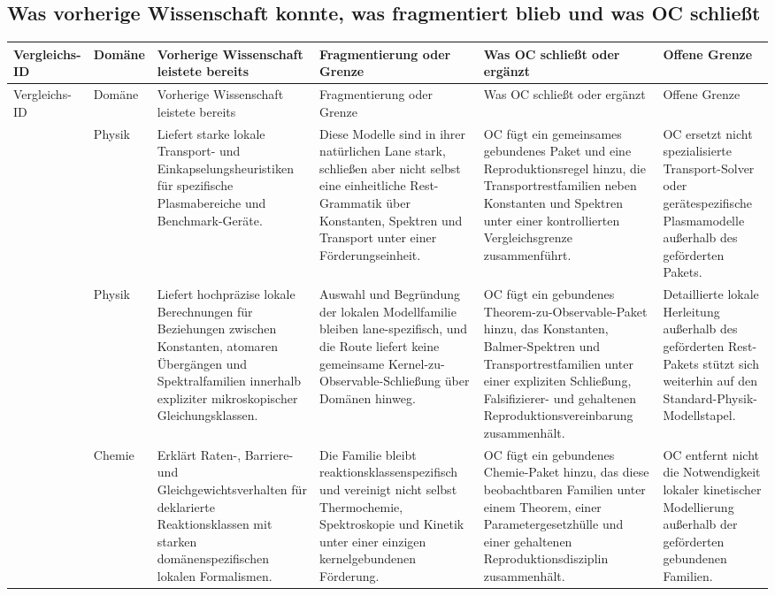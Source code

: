 \subsection{Was vorherige Wissenschaft konnte, was fragmentiert blieb und was OC schließt}
\begingroup
\scriptsize
\setlength{\emergencystretch}{1.5em}
\setlength{\tabcolsep}{2pt}
\setlength{\LTleft}{0pt}
\setlength{\LTright}{0pt}
\begin{longtable}{@{}L{0.17\textwidth}L{0.09\textwidth}L{0.17\textwidth}L{0.17\textwidth}L{0.20\textwidth}L{0.14\textwidth}@{}}
\toprule
Vergleichs-ID & Domäne & Vorherige Wissenschaft leistete bereits & Fragmentierung oder Grenze & Was OC schließt oder ergänzt & Offene Grenze \\
\midrule
\endfirsthead
\toprule
Vergleichs-ID & Domäne & Vorherige Wissenschaft leistete bereits & Fragmentierung oder Grenze & Was OC schließt oder ergänzt & Offene Grenze \\
\midrule
\endhead
{} & Physik & Liefert starke lokale Transport- und Einkapselungsheuristiken für spezifische Plasmabereiche und Benchmark-Geräte. & Diese Modelle sind in ihrer natürlichen Lane stark, schließen aber nicht selbst eine einheitliche Rest-Grammatik über Konstanten, Spektren und Transport unter einer Förderungseinheit. & OC fügt ein gemeinsames gebundenes Paket und eine Reproduktionsregel hinzu, die Transportrestfamilien neben Konstanten und Spektren unter einer kontrollierten Vergleichsgrenze zusammenführt. & OC ersetzt nicht spezialisierte Transport-Solver oder gerätespezifische Plasmamodelle außerhalb des geförderten Pakets. \\
 & Physik & Liefert hochpräzise lokale Berechnungen für Beziehungen zwischen Konstanten, atomaren Übergängen und Spektralfamilien innerhalb expliziter mikroskopischer Gleichungsklassen. & Auswahl und Begründung der lokalen Modellfamilie bleiben lane-spezifisch, und die Route liefert keine gemeinsame Kernel-zu-Observable-Schließung über Domänen hinweg. & OC fügt ein gebundenes Theorem-zu-Observable-Paket hinzu, das Konstanten, Balmer-Spektren und Transportrestfamilien unter einer expliziten Schließung, Falsifizierer- und gehaltenen Reproduktionsvereinbarung zusammenhält. & Detaillierte lokale Herleitung außerhalb des geförderten Rest-Pakets stützt sich weiterhin auf den Standard-Physik-Modellstapel. \\
 & Chemie & Erklärt Raten-, Barriere- und Gleichgewichtsverhalten für deklarierte Reaktionsklassen mit starken domänenspezifischen lokalen Formalismen. & Die Familie bleibt reaktionsklassenspezifisch und vereinigt nicht selbst Thermochemie, Spektroskopie und Kinetik unter einer einzigen kernelgebundenen Förderung. & OC fügt ein gebundenes Chemie-Paket hinzu, das diese beobachtbaren Familien unter einem Theorem, einer Parametergesetzhülle und einer gehaltenen Reproduktionsdisziplin zusammenhält. & OC entfernt nicht die Notwendigkeit lokaler kinetischer Modellierung außerhalb der geförderten gebundenen Familien. \\

\end{longtable}
